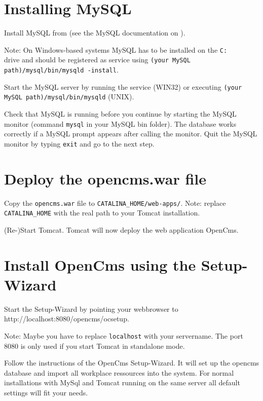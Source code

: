 \section{Installing MySQL}
Install MySQL from
(see the MySQL documentation on
).

Note: On Windows-based systems MySQL has to be installed on the
\texttt{C:\\} drive and should be registered as service using
\texttt{(your MySQL path)/mysql/bin/mysqld -install}.

Start the MySQL server by running the service (WIN32) or executing
\texttt{(your MySQL path)/mysql/bin/mysqld} (UNIX).

Check that MySQL is running before you continue by starting the
MySQL monitor (command \texttt{mysql} in your MySQL bin folder).
The database works correctly if a MySQL prompt appears after
calling the monitor. Quit the MySQL monitor by typing
\texttt{exit} and go to the next step.

\section{Deploy the opencms.war file}
Copy the \texttt{opencms.war} file to
\texttt{CATALINA\_HOME/web-apps/}. Note: replace
\texttt{CATALINA\_HOME} with the real path to your Tomcat
installation.

(Re-)Start Tomcat. Tomcat will now deploy the web application
OpenCms.

\section{Install OpenCms using the Setup-Wizard}
Start the Setup-Wizard by pointing your webbrowser to\\
	{http://localhost:8080/opencms/ocsetup}.

Note: Maybe you have to replace \texttt{localhost} with your
servername. The port 8080 is only used if you start Tomcat in
standalone mode.

Follow the instructions of the OpenCms Setup-Wizard. It will set
up the opencms database and import all workplace ressources into
the system. For normal installations with MySql and Tomcat running
on the same server all default settings will fit your needs.

